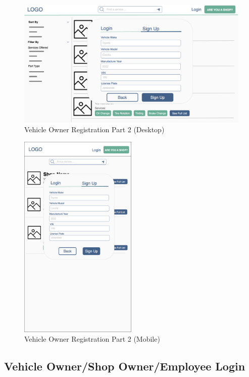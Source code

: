 \documentclass[12pt, titlepage]{article}
\begin{document}
\begin{figure}[H]
	\centering
	\includegraphics[width=\textwidth]{mockups/Vehicle Owner Sign Up (Part 2) (Desktop).png}
	\caption{Vehicle Owner Registration \textemdash{} Part 2 (Desktop)}
\end{figure}

\begin{figure}[H]
	\centering
	\includegraphics[width=0.5\textwidth]{mockups/Vehicle Owner Sign Up (Part 2) (Mobile).png}
	\caption{Vehicle Owner Registration \textemdash{} Part 2 (Mobile)}
\end{figure}

\subsection{Vehicle Owner/Shop Owner/Employee Login}
\end{document}
